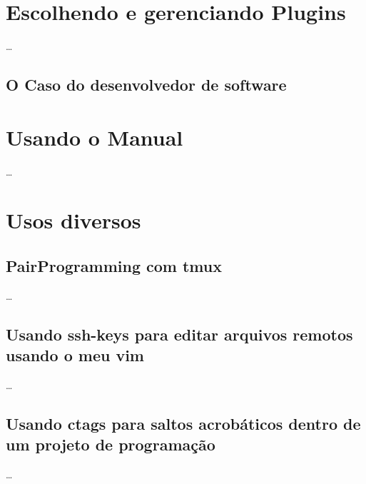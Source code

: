 \documentclass[a4paper,12pt,oneside]{book}
\begin{document}





\newcommand{\vimcommand}[1]{%
    \sethlcolor{lightgray}%
    \textbf{\textcolor{black}{\hl{#1}}}%
}
\newcommand{\vimkeys}[1]{%
    \sethlcolor{gray}%
	    \textbf{\textcolor{white}{\hl{#1}}}%
}
\newcommand{\insertfigure}[3]{
\begin{figure}[!htb]
\centering
\fbox{\texttt{[image: \#2]}}
\caption{#3}
\end{figure}
}











\chapter{Escolhendo e gerenciando Plugins}
\ldots
\section{O Caso do desenvolvedor de software}
\newpage

\chapter{Usando o Manual}
\ldots
\newpage

\chapter{Usos diversos}
\section{PairProgramming com tmux}
\ldots
\section{Usando ssh-keys para editar arquivos remotos usando o meu vim}
\ldots
\section{Usando ctags para saltos acrobáticos dentro de um projeto de programação}
\ldots
\end{document}
